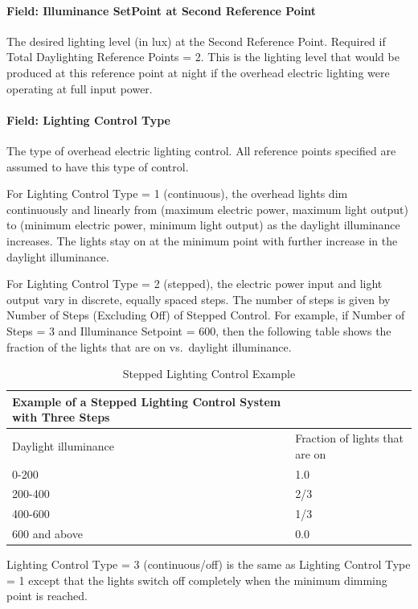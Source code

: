 \paragraph{Field: Illuminance SetPoint at Second Reference Point}\label{field-illuminance-setpoint-at-second-reference-point}

The desired lighting level (in lux) at the Second Reference Point. Required if Total Daylighting Reference Points = 2. This is the lighting level that would be produced at this reference point at night if the overhead electric lighting were operating at full input power.

\paragraph{Field: Lighting Control Type}\label{field-lighting-control-type}

The type of overhead electric lighting control. All reference points specified are assumed to have this type of control.

For Lighting Control Type = 1 (continuous), the overhead lights dim continuously and linearly from (maximum electric power, maximum light output) to (minimum electric power, minimum light output) as the daylight illuminance increases. The lights stay on at the minimum point with further increase in the daylight illuminance.

For Lighting Control Type = 2 (stepped), the electric power input and light output vary in discrete, equally spaced steps. The number of steps is given by Number of Steps (Excluding Off) of Stepped Control. For example, if Number of Steps = 3 and Illuminance Setpoint = 600, then the following table shows the fraction of the lights that are on vs.~daylight illuminance.

\begin{longtable}[c]{p{4.01in}p{1.97in}}
\caption{Stepped Lighting Control Example \protect \label{table:stepped-lighting-control-example}}\\
\toprule 
Example of a Stepped Lighting Control System with Three Steps \tabularnewline \midrule
\endhead
Daylight illuminance & Fraction of lights that are on \tabularnewline
0-200 & 1.0 \tabularnewline
200-400 & 2/3 \tabularnewline
400-600 & 1/3 \tabularnewline
600 and above & 0.0 \tabularnewline
\bottomrule
\end{longtable}

Lighting Control Type = 3 (continuous/off) is the same as Lighting Control Type = 1 except that the lights switch off completely when the minimum dimming point is reached.

